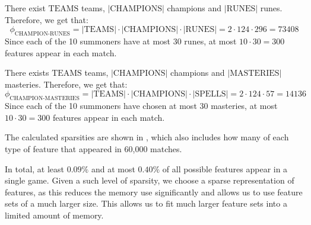 There exist $\text{TEAMS}$ teams, $|\text{CHAMPIONS}|$ champions and $|\text{RUNES}|$ runes. Therefore, we get that:
\[\phi_{\text{CHAMPION-RUNES}} = |\text{TEAMS}| \cdot |\text{CHAMPIONS}| \cdot |\text{RUNES}| = 2 \cdot 124 \cdot 296 = 73408\]
Since each of the 10 summoners have at most 30 runes, at most $10 \cdot 30 = 300$ features appear in each match.

There exists $\text{TEAMS}$ teams, $|\text{CHAMPIONS}|$ champions and $|\text{MASTERIES}|$ masteries. Therefore, we get that:
\[\phi_{\text{CHAMPION-MASTERIES}} = |\text{TEAMS}| \cdot |\text{CHAMPIONS}| \cdot |\text{SPELLS}| = 2 \cdot 124 \cdot 57 = 14136\]
Since each of the 10 summoners have chosen at most 30 masteries, at most $10 \cdot 30 = 300$ features appear in each match.

  \begin{table}[!htb]
    \centering
    \caption{The sparsity of each type of feature. (*)At most.}\label{tab:featuresparsity}
  \end{table}

The calculated sparsities are shown in , which also includes how many of each type of feature that appeared in 60,000 matches.

In total, at least $0.09 \%$ and at most $0.40\%$ of all possible features appear in a single game. Given a such level of sparsity, we choose a sparse representation of features, as this reduces the memory use significantly and allows us to use feature sets of a much larger size. This allows us to fit much larger feature sets into a limited amount of memory.